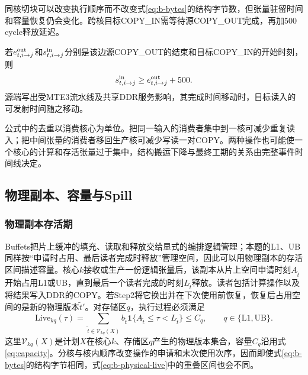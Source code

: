 同核切块可以改变执行顺序而不改变式\eqref{eq:b-bytes}的结构字节数，但张量驻留时间和容量恢复仍会变化。跨核目标COPY\_IN需等待源COPY\_OUT完成，再加500 cycle释放延迟。

若$e^{\rm out}_{t,i\to j}$和$s^{\rm in}_{t,i\to j}$分别是该边源COPY\_OUT的结束和目标COPY\_IN的开始时刻，则
\begin{equation}
s^{\rm in}_{t,i\to j}\ge e^{\rm out}_{t,i\to j}+500.
\label{eq:b-copy-release}
\end{equation}
源端写出受MTE3流水线及共享DDR服务影响，其完成时间移动时，目标读入的可发射时间随之移动。

公式中的去重以消费核心为单位。把同一输入的消费者集中到一核可减少重复读入；把中间张量的消费者移回生产核可减少写读一对COPY。两种操作也可能使一个核心的计算和存活张量过于集中，结构搬运下降与最终工期的关系由完整事件时间线决定。

\subsection{物理副本、容量与Spill}
\subsubsection{物理副本存活期}
Buffets把片上缓冲的填充、读取和释放交给显式的编排逻辑管理\cite{pellauer2019buffets}；本题的L1、UB同样按“申请时占用、最后读者完成时释放”管理空间，因此可以用物理副本的存活区间描述容量。核心$k$接收或生产一份逻辑张量后，该副本从片上空间申请时刻$A_{\tilde t}$开始占用L1或UB，直到最后一个读者完成的时刻$L_{\tilde t}$释放。读者包括计算操作以及将结果写入DDR的COPY。若Step2将它换出并在下次使用前恢复，恢复后占用空间的是新的物理版本$\tilde t'$。对存储区$q$，执行过程必须满足
\begin{equation}
\mathrm{Live}_{kq}(\tau)
=\sum_{\tilde t\in\mathcal V_{kq}(X)}b_{\tilde t}
\mathbf1\{A_{\tilde t}\le\tau<L_{\tilde t}\}
\le C_q,\qquad q\in\{\mathrm{L1},\mathrm{UB}\}.
\label{eq:b-physical-live}
\end{equation}
这里$\mathcal V_{kq}(X)$是计划$X$在核心$k$、存储区$q$产生的物理版本集合，容量$C_q$沿用式\eqref{eq:capacity}。分核与核内顺序改变操作的申请和末次使用次序，因而即使式\eqref{eq:b-bytes}的结构字节相同，式\eqref{eq:b-physical-live}中的重叠区间也会不同。

